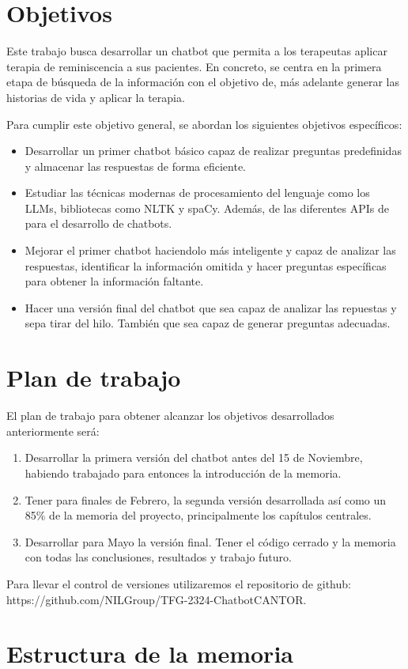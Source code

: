 \section{Objetivos}
Este trabajo  busca desarrollar un chatbot que permita a los terapeutas aplicar terapia de reminiscencia a sus pacientes. En concreto, se centra en la primera etapa de búsqueda de la información con el objetivo de, más adelante generar las historias de vida y aplicar la terapia. 

Para cumplir este objetivo general, se abordan los siguientes objetivos específicos:

 \begin{itemize}
 	
\item Desarrollar un primer chatbot básico capaz de realizar preguntas predefinidas y almacenar las respuestas de forma eficiente.
 
 \item Estudiar las técnicas modernas de procesamiento del lenguaje como los LLMs, bibliotecas como NLTK y spaCy. Además, de las diferentes APIs de para el desarrollo de chatbots. 
 
\item Mejorar el primer chatbot haciendolo más inteligente y capaz de analizar las respuestas, identificar la información omitida y hacer preguntas específicas para obtener la información faltante.
 
\item Hacer una versión final del chatbot que sea capaz de analizar las repuestas y sepa tirar del hilo. También que sea capaz de generar preguntas adecuadas. 

\end{itemize}

\section{Plan de trabajo}

El plan de trabajo para obtener alcanzar los objetivos desarrollados anteriormente será: \begin{enumerate}
	\item Desarrollar la primera versión del chatbot antes del 15 de Noviembre, habiendo trabajado para entonces la introducción de la memoria.
	\item Tener para finales de Febrero, la segunda versión desarrollada así como un 85\% de la memoria del proyecto, principalmente los capítulos centrales.  
	\item Desarrollar para Mayo la versión final. Tener el código cerrado y la memoria con todas las conclusiones, resultados y trabajo futuro. 
	
\end{enumerate}

Para llevar el control de versiones utilizaremos el repositorio de github:\\
 https://github.com/NILGroup/TFG-2324-ChatbotCANTOR. 

\section{Estructura de la memoria}